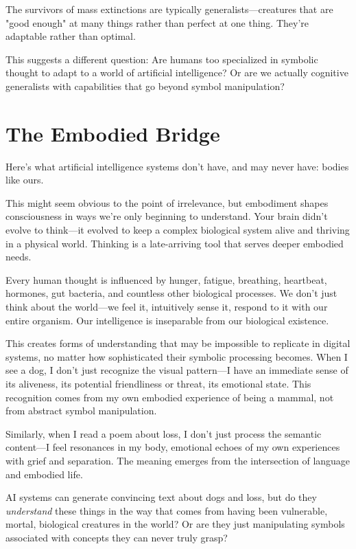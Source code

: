 \documentclass[10pt,twocolumn]{article}
\begin{document}
The survivors of mass extinctions are typically generalists—creatures that are "good enough" at many things rather than perfect at one thing. They're adaptable rather than optimal.

This suggests a different question: Are humans too specialized in symbolic thought to adapt to a world of artificial intelligence? Or are we actually cognitive generalists with capabilities that go beyond symbol manipulation?

\section{The Embodied Bridge}

Here's what artificial intelligence systems don't have, and may never have: bodies like ours.

This might seem obvious to the point of irrelevance, but embodiment shapes consciousness in ways we're only beginning to understand. Your brain didn't evolve to think—it evolved to keep a complex biological system alive and thriving in a physical world. Thinking is a late-arriving tool that serves deeper embodied needs.

Every human thought is influenced by hunger, fatigue, breathing, heartbeat, hormones, gut bacteria, and countless other biological processes. We don't just think about the world—we feel it, intuitively sense it, respond to it with our entire organism. Our intelligence is inseparable from our biological existence.

This creates forms of understanding that may be impossible to replicate in digital systems, no matter how sophisticated their symbolic processing becomes. When I see a dog, I don't just recognize the visual pattern—I have an immediate sense of its aliveness, its potential friendliness or threat, its emotional state. This recognition comes from my own embodied experience of being a mammal, not from abstract symbol manipulation.

Similarly, when I read a poem about loss, I don't just process the semantic content—I feel resonances in my body, emotional echoes of my own experiences with grief and separation. The meaning emerges from the intersection of language and embodied life.

AI systems can generate convincing text about dogs and loss, but do they \textit{understand} these things in the way that comes from having been vulnerable, mortal, biological creatures in the world? Or are they just manipulating symbols associated with concepts they can never truly grasp?
\end{document}
